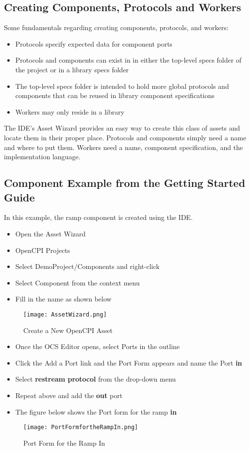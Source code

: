 \subsection{Creating Components, Protocols and Workers}
Some fundamentals regarding creating components, protocols, and workers:
\begin{itemize}
\item Protocols specify expected data for component ports
\item Protocols and components can exist in in either the top-level specs folder of the project or in a library specs folder
\item The top-level specs folder is intended to hold more global protocols and components that can be reused in library component specifications
\item Workers may only reside in a library
\end{itemize}
The IDE’s Asset Wizard provides an easy way to create this class of assets and locate them in their proper place. Protocols and components simply need a name and where to put them. Workers need a name, component specification, and the implementation language.
\subsection{Component Example from the Getting Started Guide}
In this example, the ramp component is created using the IDE.
\begin{itemize}
\item Open the Asset Wizard
\item OpenCPI Projects
\item Select DemoProject/Components and right-click
\item Select Component from the context menu
\item Fill in the name as shown below
\end{itemize}
\begin{figure}[h!]
	\centering
	\caption{Create a New OpenCPI Asset}\label{fig:CreateaNewOpenCPIAsset}
	\texttt{[image: AssetWizard.png]}
 \end{figure}
\begin{itemize}
\item Once the OCS Editor opens, select Ports in the outline
\item Click the Add a Port link and the Port Form appears and name the Port \textbf{in}
\item Select \textbf{restream protocol} from the drop-down menu
\item Repeat above and add the \textbf{out} port
\item The figure below shows the Port form for the ramp \textbf{in}
\end{itemize}
\begin{figure}[h!]
	\centering
	\caption{Port Form for the Ramp In}\label{fig:PortFormfortheRampIn}
	\texttt{[image: PortFormfortheRampIn.png]}
 \end{figure}

